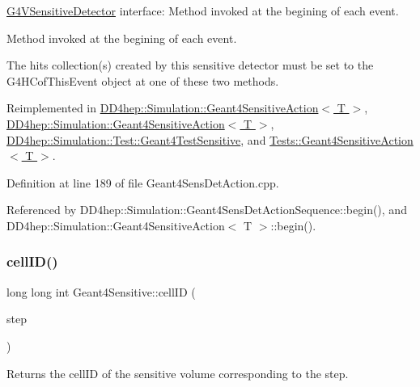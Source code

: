 \hyperlink{class_g4_v_sensitive_detector}{G4\+V\+Sensitive\+Detector} interface\+: Method invoked at the begining of each event. 

Method invoked at the begining of each event.

The hits collection(s) created by this sensitive detector must be set to the G4\+H\+Cof\+This\+Event object at one of these two methods. 

Reimplemented in \hyperlink{class_d_d4hep_1_1_simulation_1_1_geant4_sensitive_action_a2e9739b3741bb245e3cc7edb41e7374d}{D\+D4hep\+::\+Simulation\+::\+Geant4\+Sensitive\+Action$<$ T $>$}, \hyperlink{class_d_d4hep_1_1_simulation_1_1_geant4_sensitive_action_a601b872018378ba77a1573f4458b61e1}{D\+D4hep\+::\+Simulation\+::\+Geant4\+Sensitive\+Action$<$ T $>$}, \hyperlink{class_d_d4hep_1_1_simulation_1_1_test_1_1_geant4_test_sensitive_a7d7593372b9bfcc1e1a3f21ceef841d8}{D\+D4hep\+::\+Simulation\+::\+Test\+::\+Geant4\+Test\+Sensitive}, and \hyperlink{class_tests_1_1_geant4_sensitive_action_a739fa2551e0217a591c5e99ae09d883a}{Tests\+::\+Geant4\+Sensitive\+Action$<$ T $>$}.



Definition at line 189 of file Geant4\+Sens\+Det\+Action.\+cpp.



Referenced by D\+D4hep\+::\+Simulation\+::\+Geant4\+Sens\+Det\+Action\+Sequence\+::begin(), and D\+D4hep\+::\+Simulation\+::\+Geant4\+Sensitive\+Action$<$ T $>$\+::begin().

\hypertarget{class_d_d4hep_1_1_simulation_1_1_geant4_sensitive_a1e79173455ccff4d70cd1325b26ad3e9}{}\label{class_d_d4hep_1_1_simulation_1_1_geant4_sensitive_a1e79173455ccff4d70cd1325b26ad3e9} 
\subsubsection{\texorpdfstring{cell\+I\+D()}{cellID()}}
{\footnotesize\ttfamily long long int Geant4\+Sensitive\+::cell\+ID (\begin{DoxyParamCaption}\item[{const G4\+Step $\ast$}]{step }\end{DoxyParamCaption})}



Returns the cell\+ID of the sensitive volume corresponding to the step. 

